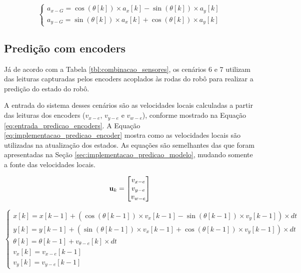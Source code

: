 \documentclass[acronym, symbols, table]{fei}
\begin{document}
			\begin{equation}\label{eq:calculo_accel_global}
				\begin{cases}
					a_{x-G} = \cos(\theta[k]) \times a_x[k] - \sin(\theta[k]) \times a_y[k] \\
					a_{y-G} = \sin(\theta[k]) \times a_x[k] + \cos(\theta[k]) \times a_y[k]
				\end{cases}
			\end{equation}
			
		\subsection{Predição com encoders}\label{sec:implementacao_predicao_encoders}
		
			Já de acordo com a Tabela \ref{tbl:combinacao_sensores}, os cenários 6 e 7 utilizam das leituras capturadas pelos encoders acoplados às rodas do robô para realizar a predição do estado do robô.
			
			A entrada do sistema desses cenários são as velocidades locais calculadas a partir das leituras dos encoders ($v_{x-e}$, $v_{y-e}$ e $v_{w-e}$), conforme mostrado na Equação \ref{eq:entrada_predicao_encoders}. A Equação \ref{eq:implementacao_predicao_encoder} mostra como as velocidades locais são utilizadas na atualização dos estados. As equações são semelhantes das que foram apresentadas na Seção \ref{sec:implementacao_predicao_modelo}, mudando somente a fonte das velocidades locais.
			
			\begin{equation}\label{eq:entrada_predicao_encoders}
				\text{\textbf{u}}_k =
				\begin{bmatrix}
					v_{x-e} \\
					v_{y-e} \\
					v_{w-e}
				\end{bmatrix}
			\end{equation}
			
			\begin{equation}\label{eq:implementacao_predicao_encoder}
				\begin{cases}
					x[k] = x[k-1] + (\cos(\theta[k-1]) \times v_x[k-1] - \sin(\theta[k-1]) \times v_y[k-1]) \times dt \\
					y[k] = y[k-1] + (\sin(\theta[k-1]) \times v_x[k-1] + \cos(\theta[k-1]) \times v_y[k-1]) \times dt  \\
					\theta[k] = \theta[k-1] + v_{\theta-e}[k] \times dt \\
					v_x[k] = v_{x-e}[k-1]\\
					v_y[k] = v_{y-e}[k-1]
				\end{cases}
			\end{equation}
		
\end{document}
